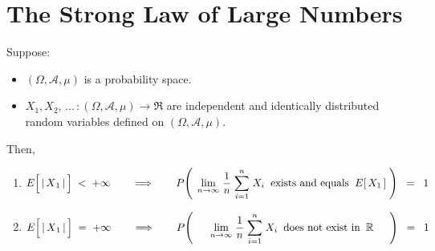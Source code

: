 

\section{The Strong Law of Large Numbers}
\setcounter{theorem}{0}
\setcounter{equation}{0}


\renewcommand{\theenumi}{\roman{enumi}}
\renewcommand{\labelenumi}{\textnormal{(\theenumi)}$\;\;$}


\begin{theorem}
\mbox{}\vskip 0.1cm
\noindent
Suppose:
\begin{itemize}
\item
	$(\Omega,\mathcal{A},\mu)$ is a probability space.
\item
	$X_{1}, X_{2}, \,\ldots\, : (\Omega,\mathcal{A},\mu) \longrightarrow \Re$ are
	independent and identically distributed random variables
	defined on $(\Omega,\mathcal{A},\mu)$.
\end{itemize}
Then,
\begin{enumerate}
\item\label{FiniteExpectiationImpliesStrongLaw}
	\begin{equation*}
	E\!\left[\,\vert\,\overset{{\color{white}.}}{X}_{1}\,\vert\,\right] \;<\; +\infty
	\quad\quad\Longrightarrow\quad\quad
	P\!\left(\;\,
		\underset{n\rightarrow\infty}{\lim}\;
		\dfrac{1}{n}\;\overset{n}{\underset{i=1}{\sum}}\;X_{i}
		\;\;\textnormal{exists and equals}\;\;
		E[\,X_{1}\,]
		\;\right)
	\;\; = \;\; 1
	\end{equation*}
\item
	\begin{equation*}
	E\!\left[\,\vert\,\overset{{\color{white}.}}{X}_{1}\,\vert\,\right] \;=\; +\infty
	\quad\quad\Longrightarrow\quad\quad
	P\!\left(\;
		{\color{white}1...}
		\underset{n\rightarrow\infty}{\lim}\;
		\dfrac{1}{n}\;\overset{n}{\underset{i=1}{\sum}}\;X_{i}
		\;\;\textnormal{does not exist in}\;\; \Re
		{\color{white}1...}
		\,\right)
	\;\; = \;\; 1
	\end{equation*}
\end{enumerate}
\end{theorem}
\proof

